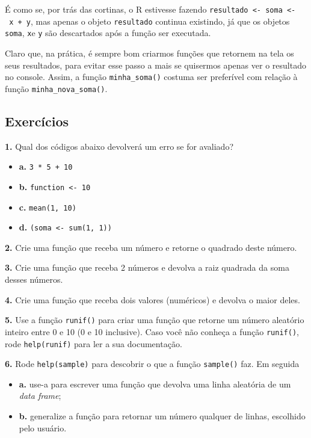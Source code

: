 \documentclass[
]{book}
\begin{document}
É como se, por trás das cortinas, o R estivesse fazendo \texttt{resultado\ \textless{}-\ soma\ \textless{}-\ x\ +\ y}, mas apenas o objeto \texttt{resultado} continua existindo, já que os objetos \texttt{soma}, \texttt{x}e \texttt{y} são descartados após a função ser executada.

Claro que, na prática, é sempre bom criarmos funções que retornem na tela os seus resultados, para evitar esse passo a mais se quisermos apenas ver o resultado no console. Assim, a função \texttt{minha\_soma()} costuma ser preferível com relação à função \texttt{minha\_nova\_soma()}.

\hypertarget{exercuxedcios-7}{%
\subsection*{Exercícios}\label{exercuxedcios-7}}

\textbf{1.} Qual dos códigos abaixo devolverá um erro se for avaliado?

\begin{itemize}
\item
  \textbf{a.} \texttt{3\ *\ 5\ +\ 10}
\item
  \textbf{b.} \texttt{function\ \textless{}-\ 10}
\item
  \textbf{c.} \texttt{mean(1,\ 10)}
\item
  \textbf{d.} \texttt{(soma\ \textless{}-\ sum(1,\ 1))}
\end{itemize}

\textbf{2.} Crie uma função que receba um número e retorne o quadrado deste número.

\textbf{3.} Crie uma função que receba 2 números e devolva a raiz quadrada da soma desses números.

\textbf{4.} Crie uma função que receba dois valores (numéricos) e devolva o maior deles.

\textbf{5.} Use a função \texttt{runif()} para criar uma função que retorne um número aleatório inteiro entre 0 e 10 (0 e 10 inclusive). Caso você não conheça a função \texttt{runif()}, rode \texttt{help(runif)} para ler a sua documentação.

\textbf{6.} Rode \texttt{help(sample)} para descobrir o que a função \texttt{sample()} faz. Em seguida

\begin{itemize}
\item
  \textbf{a.} use-a para escrever uma função que devolva uma linha aleatória de um \emph{data frame};
\item
  \textbf{b.} generalize a função para retornar um número qualquer de linhas, escolhido pelo usuário.
\end{itemize}
\end{document}
